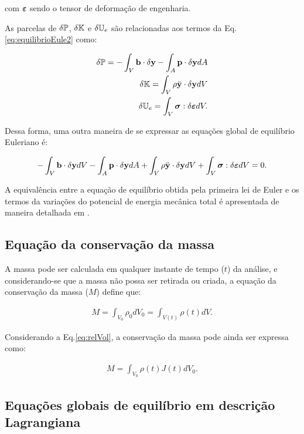 \documentclass[tese_patricia]{subfiles}
\begin{document}
\noindent com $\bm{\varepsilon}$ sendo o tensor de deformação de engenharia.

As parcelas de $\delta\mathbb{P}$, $\delta\mathbb{K}$ e $\delta\mathbb{U}_e$ são relacionadas aos termos da Eq. \eqref{eq:equilibrioEule2} como:

\begin{align}
\delta\mathbb{P} = - \int_{V} \mathbf{b} \cdot \delta \mathbf{y} - \int_{A} \mathbf{p} \cdot \delta\mathbf{y} dA \\
\delta\mathbb{K} = \int_{V} \rho \ddot{\mathbf{y}} \cdot \delta\mathbf{y} dV\\
\delta\mathbb{U}_e = \int_{V}\boldsymbol{\sigma} : \delta\bm{\varepsilon} dV.
\end{align}

Dessa forma, uma outra maneira de se expressar as equações global de equilíbrio Euleriano é:

\begin{align}
-\int_{V}  \mathbf{b} \cdot \delta \mathbf{y} dV - \int_{A} \mathbf{p} \cdot \delta\mathbf{y}  dA + \int_{V} \rho  \ddot{\mathbf{y}} \cdot \delta \mathbf{y}  dV + \int_{V}\boldsymbol{\sigma} : \delta\bm{\varepsilon} dV = 0. \label{eq:EquilibrioEuleFinal}
\end{align}

A equivalência entre a equação de equilíbrio obtida pela primeira lei de Euler e os termos da variações do potencial de energia mecânica total é apresentada de maneira detalhada em .

\subsection{Equação da conservação da massa}

A massa pode ser calculada em qualquer instante de tempo ($t$) da análise, e considerando-se que a massa não possa ser retirada ou criada, a equação da conservação da massa ($M$) define que:

\begin{align}
M = \int_{V_{0}} \rho_{0}dV_{0} = \int_{V(t)} \rho(t)dV. \label{eq:conserMassa}
\end{align}

Considerando a Eq.\ref {eq:relVol}, a conservação da massa pode ainda ser expressa como:

\begin{align}
M = \int_{V_{0}} \rho(t) J(t) dV_{0}. \label{eq:conserMassa2}
\end{align}

\subsection{Equações globais de equilíbrio em descrição Lagrangiana}
\end{document}
